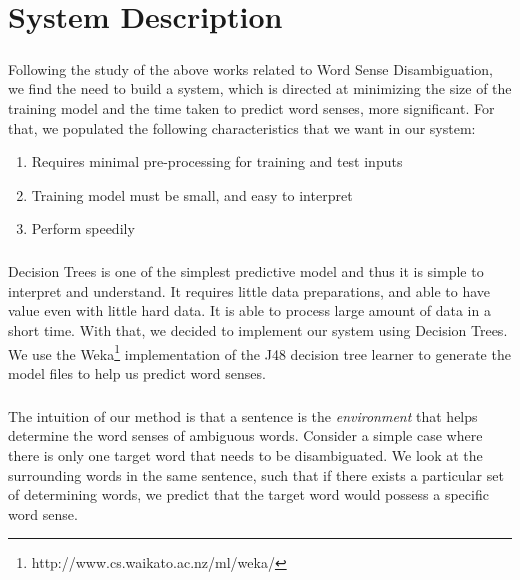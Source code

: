 \chapter{System Description}
\label{systemdescription}
\paragraph{}
Following the study of the above works related to Word Sense Disambiguation, we find the need to build a system, which is directed at minimizing the size of the training model and the time taken to predict word senses, more significant. For that, we populated the following characteristics that we want in our system:
\begin{enumerate}
\item Requires minimal pre-processing for training and test inputs
\item Training model must be small, and easy to interpret
\item Perform speedily
\end{enumerate}

\paragraph{}
Decision Trees is one of the simplest predictive model and thus it is simple to interpret and understand. It requires little data preparations, and able to have value even with little hard data. It is able to process large amount of data in a short time. With that, we decided to implement our system using Decision Trees. We use the Weka\footnote{http://www.cs.waikato.ac.nz/ml/weka/} implementation of the J48 decision tree learner to generate the model files to help us predict word senses.

\paragraph{}
The intuition of our method is that a sentence is the \textit{environment} that helps determine the word senses of ambiguous words. Consider a simple case where there is only one target word that needs to be disambiguated. We look at the surrounding words in the same sentence, such that if there exists a particular set of determining words, we predict that the target word would possess a specific word sense.


